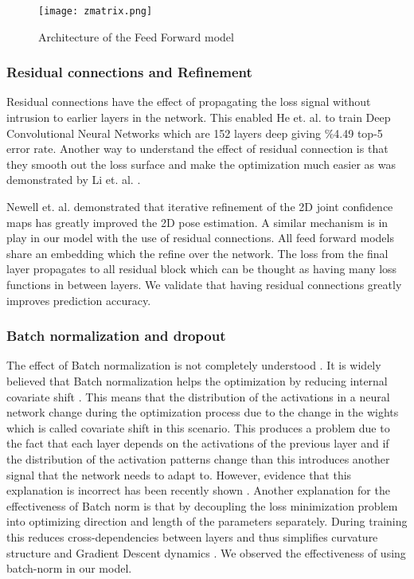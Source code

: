 \begin{figure}[htpb]
    \texttt{[image: zmatrix.png]}
    \caption{Architecture of the Feed Forward model}
    \label{fig:feedforward-network}
\end{figure}

\subsubsection{Residual connections and Refinement}

Residual connections have the effect of propagating the loss signal without intrusion to earlier layers in the network. This enabled He et. al. \parencite{he2016deep} to train Deep Convolutional Neural Networks which are  152 layers deep giving \%4.49 top-5 error rate. Another way to understand the effect of residual connection is that they smooth out the loss surface and make the optimization much easier as was demonstrated by Li et. al. \parencite{li2017visualizing}.

Newell et. al. \parencite{newell2016stacked} demonstrated that iterative refinement of the 2D joint confidence maps has greatly improved the 2D pose estimation. A similar mechanism is in play in our model with the use of residual connections. All feed forward models share an embedding which the refine over the network. The loss from the final layer propagates to all residual block which can be thought as having many loss functions in between layers. We validate that having residual connections greatly improves prediction accuracy.   

\subsubsection{Batch normalization and dropout}

The effect of Batch normalization \parencite{ioffe2015batch} is not completely understood \parencite{kohler2018towards}. It is widely believed that Batch normalization helps the optimization by reducing internal covariate shift \parencite{ioffe2015batch}. This means that the distribution of the activations in a neural network change during the optimization process due to the change in the wights which is called covariate shift in this scenario. This produces a problem due to the fact that each layer depends on the activations of the previous layer and if the distribution of the activation patterns change than this introduces another signal that the network needs to adapt to. However, evidence that this explanation is incorrect has been recently shown \parencite{santurkar2018does}. Another explanation for the effectiveness of Batch norm is that by decoupling the loss minimization problem into optimizing direction and length of the parameters separately. During training this reduces cross-dependencies between layers and thus simplifies curvature structure and Gradient Descent dynamics \parencite{kohler2018towards}. We observed the effectiveness of using batch-norm in our model.

